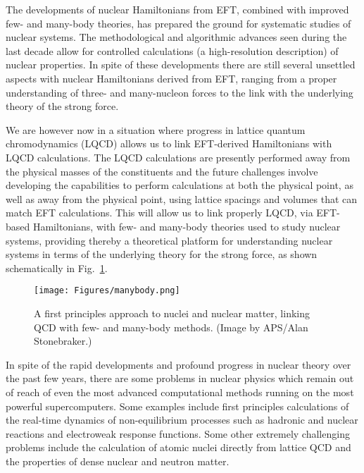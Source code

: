 \documentclass[11pt]{article}
\begin{document}
The developments of nuclear Hamiltonians from EFT, combined with
improved few- and many-body theories, has prepared the ground for
systematic studies of nuclear systems. The methodological and
algorithmic advances seen during the last decade allow for controlled
calculations (a high-resolution description) of nuclear properties. In
spite of these developments there are still several unsettled aspects
with nuclear Hamiltonians derived from EFT, ranging from a proper
understanding of three- and many-nucleon forces to the link with the
underlying theory of the strong force.

We are however now in a situation where progress in lattice quantum
chromodynamics (LQCD) allows us to link
EFT-derived Hamiltonians with LQCD calculations. The
LQCD calculations are presently performed away from the physical
masses of the constituents and the future challenges involve
developing the capabilities to perform calculations at both the
physical point, as well as away from the physical point, using lattice
spacings and volumes that can match EFT calculations.  This will allow
us to link properly LQCD, via EFT-based Hamiltonians, with few- and
many-body theories used to study nuclear systems, providing thereby a
theoretical platform for understanding nuclear systems in terms of the
underlying theory for the strong force, as shown schematically in Fig.~\ref{forces}.

\begin{figure}[hbtp]
\begin{center}
  \texttt{[image: Figures/manybody.png]}
\end{center}
\caption{A first principles approach to nuclei and nuclear matter, linking QCD with few- and many-body methods. (Image by APS/Alan Stonebraker.)}
\label{forces}
\end{figure}


In spite of the rapid developments and profound progress in nuclear theory over the past few years, there are some problems in nuclear physics which remain out of reach of even the most advanced computational methods running on the most powerful supercomputers.  Some examples include first principles calculations of the real-time dynamics of non-equilibrium processes such as hadronic and nuclear reactions and electroweak response functions.  Some other extremely challenging problems include the calculation of atomic nuclei directly from lattice QCD and the properties of dense nuclear and neutron matter.  
\end{document}
